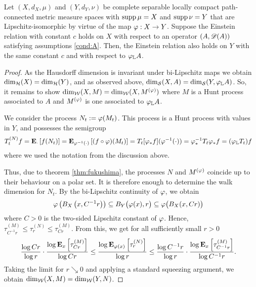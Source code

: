 \begin{prop}\label{prop:mmiso}
  Let $(X,d_X,\mu)$ and $(Y,d_Y,\nu)$ be complete separable locally compact path-connected metric measure spaces with $\supp\mu=X$ and $\supp\nu=Y$ that are Lipschitz-isomorphic by virtue of the map $\gp:X\to Y$. Suppose the Einstein relation with constant $c$ holds on $X$ with respect to an operator $(A,\scD(A))$ satisfying assumptions \ref{cond:A}. Then, the Einstein relation also holds on $Y$ with the same constant $c$ and with respect to $\gp_{\IL} A$.
\end{prop}
\begin{proof}
  As the Hausdorff dimension is invariant under bi-Lipschitz maps we obtain $\dimh(X)=\dimh(Y)$, and as observed above, $\dims(X,A)=\dims(Y,\gp_{\IL} A)$. So, it remains to show $\dimw(X,M)=\dimw(X,M^{(\gp)})$ where $M$ is a Hunt process associated to $A$ and $M^{(\gp)}$ is one associated to $\gp_{\IL} A$. 
  
  We consider the process $N_t:=\gp(M_t)$. This process is a Hunt process with values in $Y$, and possesses the semigroup
  \[
    T_t^{(N)}f
    =\PTEp{f(N_t)}{\cdot}
    =\PTEp{(f\circ\gp)(M_t)}{\gp^{-1}(\cdot)}
    =T_t[\gp_*f](\gp^{-1}(\cdot))
    =\gp_*^{-1}T_t\gp_* f
    =(\gp_{\IL} T_t)f
  \]
  where we used the notation from the discussion above. 
  
  Thus, due to theorem \ref{thm:fukushima}, the processes $N$ and $M^{(\gp)}$ coincide up to their behaviour on a polar set. It is therefore enough to determine the walk dimension for $N_t$. By the bi-Lipschitz continuity of $\gp$, we obtain 
  \[
    \gp\left(B_X\left(x,C^{-1}r\right)\right)
    \ssq B_Y\big(\gp(x),r\big) 
    \ssq \gp\big(B_X(x,Cr)\big)
  \]
  where $C>0$ is the two-sided Lipschitz constant of $\gp$. Hence, $\tau_{C^{-1}r}^{(M)}\leq \tau_r^{(N)}\leq \tau_{Cr}^{(M)}$. From this, we get for all sufficiently small $r>0$
  \[
    \frac{\log Cr}{\log r}
     \cdot\frac{\log \PTEp{\tau_{Cr}^{(M)}}{x}}{\log Cr}
    \leq \frac{\log \PTEp{\tau_r^{(N)}}{\gp(x)}}{\log r}
    \leq \frac{\log C^{-1}r}{\log r}
     \cdot\frac{\log \PTEp{\tau_{C^{-1}r}^{(M)}}{x}}{\log C^{-1}r}.
  \]
  Taking the limit for $r\searrow0$ and applying a standard squeezing argument, we obtain $\dimw(X,M)=\dimw(Y,N)$. 
\end{proof}
